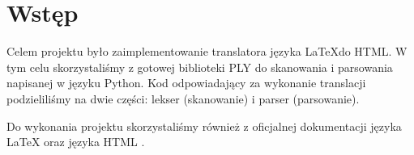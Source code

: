 \chapter{Wstęp}

Celem projektu było zaimplementowanie translatora języka \LaTeX \space do HTML. W tym celu skorzystaliśmy z gotowej
biblioteki PLY \cite{ply} do skanowania i parsowania napisanej w języku Python. Kod odpowiadający za wykonanie translacji 
podzieliliśmy na dwie części: lekser (skanowanie) i parser (parsowanie). 

Do wykonania projektu skorzystaliśmy również z oficjalnej dokumentacji języka \LaTeX \space \cite{overleaf} 
oraz języka HTML \cite{html}.